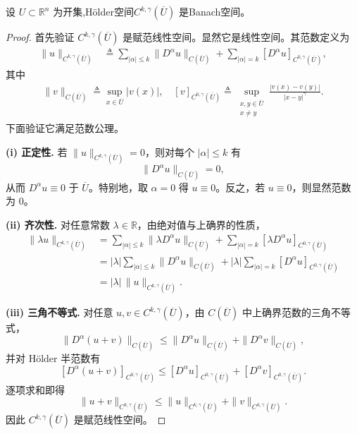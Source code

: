 \documentclass[../../main.tex]{subfiles}
\begin{document}
\begin{theorem}[H\"older空间是Banach空间]\label{theorem:ch05-holder空间Banach}
设 $U\subset\mathbb{R}^{n}$ 为开集,H\"older空间$C^{k,\gamma}(\overline{U})$ 是Banach空间。
\end{theorem}
\begin{proof}

首先验证 \(C^{k,\gamma}(\overline{U})\) 是赋范线性空间。显然它是线性空间。其范数定义为
\begin{align*}
\|u\|_{C^{k,\gamma}(\overline{U})}
&\triangleq \sum_{|\alpha|\leqslant k}\|D^\alpha u\|_{C(\overline{U})}
+\sum_{|\alpha|=k}[D^\alpha u]_{C^{0,\gamma}(\overline{U})},
\end{align*}
其中
\begin{align*}
\|v\|_{C(\overline{U})}
\triangleq \sup_{x\in\overline{U}}|v(x)|,\quad 
[v]_{C^{0,\gamma}(\overline{U})}\triangleq \sup_{\substack{x,y\in\overline{U}\\x\neq y}}
\frac{|v(x)-v(y)|}{|x-y|^\gamma}.
\end{align*}
下面验证它满足范数公理。

\textbf{(i) 正定性.}
若 \(\|u\|_{C^{k,\gamma}(\overline{U})}=0\)，则对每个 \(|\alpha|\leqslant k\) 有
\[
\|D^\alpha u\|_{C(\overline{U})}=0,
\]
从而 \(D^\alpha u\equiv 0\) 于 \(\overline{U}\)。特别地，取 \(\alpha=0\) 得 \(u\equiv0\)。反之，若 \(u\equiv0\)，则显然范数为 \(0\)。

\textbf{(ii) 齐次性.}
对任意常数 \(\lambda\in\mathbb{R}\)，由绝对值与上确界的性质，
\begin{align*}
\|\lambda u\|_{C^{k,\gamma}(\overline{U})}
&=\sum_{|\alpha|\leqslant k}\|\lambda D^\alpha u\|_{C(\overline{U})}
+\sum_{|\alpha|=k}[\lambda D^\alpha u]_{C^{0,\gamma}(\overline{U})}\\
&=|\lambda|\sum_{|\alpha|\leqslant k}\|D^\alpha u\|_{C(\overline{U})}
+|\lambda|\sum_{|\alpha|=k}[D^\alpha u]_{C^{0,\gamma}(\overline{U})}\\
&=|\lambda|\,\|u\|_{C^{k,\gamma}(\overline{U})}.
\end{align*}

\textbf{(iii) 三角不等式.}
对任意 \(u,v\in C^{k,\gamma}(\overline{U})\)，由 \(C(\overline{U})\) 中上确界范数的三角不等式，
\[
\|D^\alpha(u+v)\|_{C(\overline{U})}
\leqslant \|D^\alpha u\|_{C(\overline{U})}
+\|D^\alpha v\|_{C(\overline{U})},
\]
并对 Hölder 半范数有
\[
[D^\alpha(u+v)]_{C^{0,\gamma}(\overline{U})}
\leqslant [D^\alpha u]_{C^{0,\gamma}(\overline{U})}
+[D^\alpha v]_{C^{0,\gamma}(\overline{U})}.
\]
逐项求和即得
\[
\|u+v\|_{C^{k,\gamma}(\overline{U})}
\leqslant \|u\|_{C^{k,\gamma}(\overline{U})}
+\|v\|_{C^{k,\gamma}(\overline{U})}.
\]
因此 \(C^{k,\gamma}(\overline{U})\) 是赋范线性空间。


\end{proof}
\end{document}
